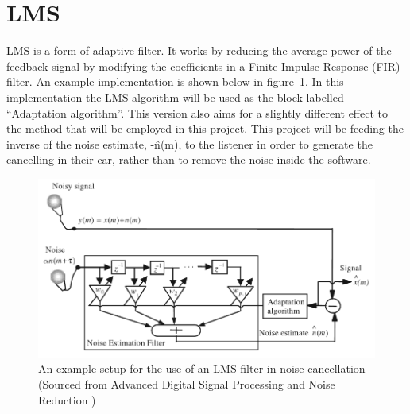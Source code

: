 \section{LMS}
LMS is a form of adaptive filter.
It works by reducing the average power of the feedback signal by modifying the coefficients in a Finite Impulse Response (FIR) filter.
An example implementation is shown below in figure~\ref{fig:lmsfilter}.
In this implementation the LMS algorithm will be used as the block labelled ``Adaptation algorithm''.
This version also aims for a slightly different effect to the method that will be employed in this project.
This project will be feeding the inverse of the noise estimate, -\^{n}(m), to the listener in order to generate the cancelling in their ear, rather than to remove the noise inside the software.

\begin{figure}[H]
	\centering
	\includegraphics[width=\textwidth]{./img/lmsfilter.png}
	\caption{An example setup for the use of an LMS filter in noise cancellation (Sourced from Advanced Digital Signal Processing and Noise Reduction \cite{AdvancedDSPing})}
	\label{fig:lmsfilter}
\end{figure}


